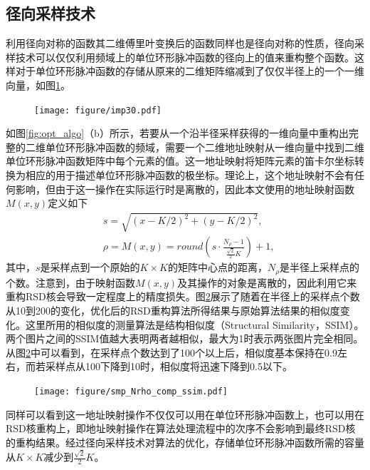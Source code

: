 \documentclass[master]{shtthesis}             %
\begin{document}
\subsection{径向采样技术}

利用径向对称的函数其二维傅里叶变换后的函数同样也是径向对称的性质\citep{baddour2011two}，径向采样技术可以仅仅利用频域上的单位环形脉冲函数的径向上的值来重构整个函数。这样对于单位环形脉冲函数的存储从原来的二维矩阵缩减到了仅仅半径上的一个一维向量，如图\ref{fig:imp_rad}。
\begin{figure}[!tb]
    \centering
    \texttt{[image: figure/imp30.pdf]}
    \label{fig:imp_rad}
\end{figure}

如图\ref{fig:opt_algo}（b）所示，若要从一个沿半径采样获得的一维向量中重构出完整的二维单位环形脉冲函数的频域，需要一个二维地址映射从一维向量中找到二维单位环形脉冲函数矩阵中每个元素的值。这一地址映射将矩阵元素的笛卡尔坐标转换为相应的用于描述单位环形脉冲函数的极坐标。理论上，这个地址映射不会有任何影响，但由于这一操作在实际运行时是离散的，因此本文使用的地址映射函数$M(x,y)$定义如下
\begin{align}
    &s=\sqrt{(x-K/2)^2+(y-K/2)^2},  \\
    &\rho = M(x, y) = round\left( s\cdot \frac{N_{\rho}-1}{\frac{\sqrt{2}}{2}K} \right)+1,\label{eq:mapping_func}
\end{align}
其中，$s$是采样点到一个原始的$K\times K$的矩阵中心点的距离，$N_\rho$是半径上采样点的个数。注意到，由于映射函数$M(x,y)$及其操作的对象是离散的，因此利用它来重构RSD核会导致一定程度上的精度损失。图\ref{fig:smp_comp}展示了随着在半径上的采样点个数从10到200的变化，优化后的RSD重构算法所得结果与原始算法结果的相似度变化。这里所用的相似度的测量算法是结构相似度（Structural Similarity，SSIM）。两个图片之间的SSIM值越大表明两者越相似，最大为1时表示两张图片完全相同。从图\ref{fig:smp_comp}中可以看到，在采样点个数达到了100个以上后，相似度基本保持在0.9左右，而若采样点从100下降到10时，相似度将迅速下降到0.5以下。
\begin{figure}[!tb]
    \centering
    \texttt{[image: figure/smp\_Nrho\_comp\_ssim.pdf]}
    \label{fig:smp_comp}
\end{figure}

同样可以看到这一地址映射操作不仅仅可以用在单位环形脉冲函数上，也可以用在RSD核重构上，即地址映射操作在算法处理流程中的次序不会影响到最终RSD核的重构结果。经过径向采样技术对算法的优化，存储单位环形脉冲函数所需的容量从$K\times K$减少到$\frac{\sqrt{2}}{2}K$。
\end{document}
